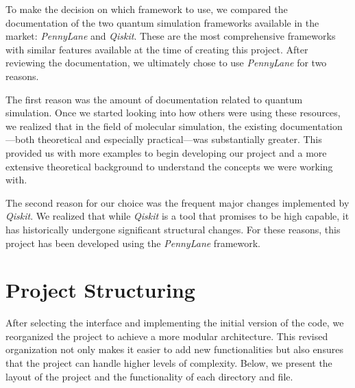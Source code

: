 To make the decision on which framework to use, we compared the documentation of the two quantum simulation frameworks available in the market: \textit{PennyLane} and \textit{Qiskit}. These are the most comprehensive frameworks with similar features available at the time of creating this project. After reviewing the documentation, we ultimately chose to use \textit{PennyLane} for two reasons.

The first reason was the amount of documentation related to quantum simulation. Once we started looking into how others were using these resources, we realized that in the field of molecular simulation, the existing documentation—both theoretical and especially practical—was substantially greater. This provided us with more examples to begin developing our project and a more extensive theoretical background to understand the concepts we were working with.

The second reason for our choice was the frequent major changes implemented by \textit{Qiskit}. We realized that while \textit{Qiskit} is a tool that promises to be high capable, it has historically undergone significant structural changes. For these reasons, this project has been developed using the \textit{PennyLane} framework.

\section{Project Structuring}

After selecting the interface and implementing the initial version of the code, we reorganized the project to achieve a more modular architecture. This revised organization not only makes it easier to add new functionalities but also ensures that the project can handle higher levels of complexity. Below, we present the layout of the project and the functionality of each directory and file.


